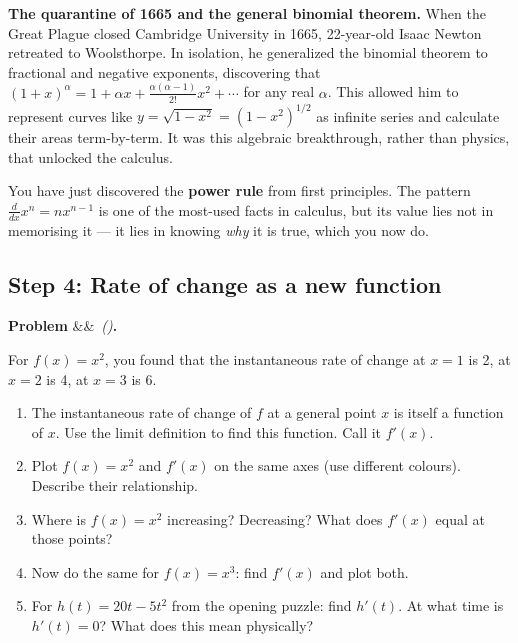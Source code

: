 \documentclass[12pt, a4paper]{article}
\newcounter{problem}
\newenvironment{problem}[1][]{%
  \refstepcounter{problem}%
  \par\vspace{6pt}%
  \noindent\textbf{\color{MidBlue}Problem \theproblem}%
  \ifx&#1&\else\ \textit{(#1)}\fi\textbf{.}\enskip
}{\par\vspace{4pt}}
\begin{document}
\begin{thought}
\textbf{The quarantine of 1665 and the general binomial theorem.}
When the Great Plague closed Cambridge University in 1665, 22-year-old Isaac Newton retreated to Woolsthorpe. In isolation, he generalized the binomial theorem to fractional and negative exponents, discovering that $(1+x)^\alpha = 1 + \alpha x + \frac{\alpha(\alpha-1)}{2!}x^2 + \cdots$ for any real $\alpha$. This allowed him to represent curves like $y = \sqrt{1-x^2} = (1-x^2)^{1/2}$ as infinite series and calculate their areas term-by-term. It was this algebraic breakthrough, rather than physics, that unlocked the calculus.
\end{thought}

\medskip
You have just discovered the \textbf{power rule} from first principles. The pattern $\frac{d}{dx}x^n = nx^{n-1}$ is one of the most-used facts in calculus, but its value lies not in memorising it --- it lies in knowing \emph{why} it is true, which you now do.


\subsection{Step 4: Rate of change as a new function}

\begin{problem}
\label{prob:deriv_as_func}
For $f(x) = x^2$, you found that the instantaneous rate of change at $x = 1$ is 2, at $x = 2$ is 4, at $x = 3$ is 6.
\begin{enumerate}[label=(\alph*), topsep=2pt]
  \item The instantaneous rate of change of $f$ at a general point $x$ is itself a function of $x$. Use the limit definition to find this function. Call it $f'(x)$.
  \item Plot $f(x) = x^2$ and $f'(x)$ on the same axes (use different colours). Describe their relationship.
  \item Where is $f(x) = x^2$ increasing? Decreasing? What does $f'(x)$ equal at those points?
  \item Now do the same for $f(x) = x^3$: find $f'(x)$ and plot both.
  \item For $h(t) = 20t - 5t^2$ from the opening puzzle: find $h'(t)$. At what time is $h'(t) = 0$? What does this mean physically?
\end{enumerate}
\end{problem}
\end{document}
